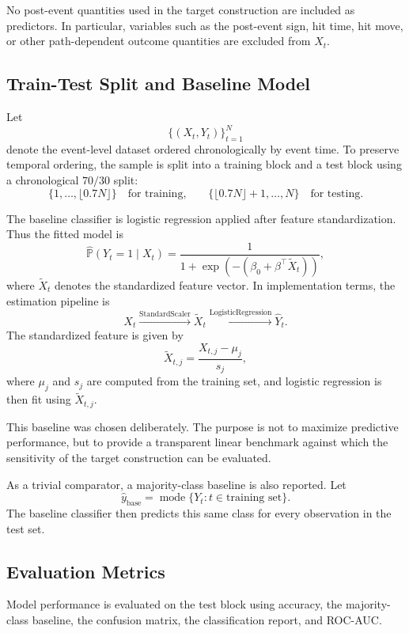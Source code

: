 \documentclass[11pt,a4paper]{article}
\begin{document}
	No post-event quantities used in the target construction are included as predictors. In particular, variables such as the post-event sign, hit time, hit move, or other path-dependent outcome quantities are excluded from \(X_t\).

	\subsection{Train-Test Split and Baseline Model}

	Let
	\[
	\{(X_t,Y_t)\}_{t=1}^{N}
	\]
	denote the event-level dataset ordered chronologically by event time. To preserve temporal ordering, the sample is split into a training block and a test block using a chronological \(70/30\) split:
	\[
	\{1,\dots,\lfloor 0.7N \rfloor\}
	\quad \text{for training,}
	\qquad
	\{\lfloor 0.7N \rfloor +1,\dots,N\}
	\quad \text{for testing.}
	\]

	The baseline classifier is logistic regression applied after feature standardization. Thus the fitted model is
	\[
	\widehat{\mathbb{P}}(Y_t=1\mid X_t)
	=
	\frac{1}{1+\exp\!\left(-(\beta_0+\beta^\top \widetilde X_t)\right)},
	\]
	where \(\widetilde X_t\) denotes the standardized feature vector. In implementation terms, the estimation pipeline is 
	\[
	X_t \xrightarrow{\text{StandardScaler}} \widetilde X_t \xrightarrow{\text{LogisticRegression}} \widehat Y_t.
	\]
	The standardized feature is given by
	\[
	\widetilde X_{t,j}=\frac{X_{t,j}-\mu_j}{s_j},
	\]
	where \(\mu_j\) and \(s_j\) are computed from the training set, and logistic regression is then fit using \(\widetilde X_{t,j}\).

	This baseline was chosen deliberately. The purpose is not to maximize predictive performance, but to provide a transparent linear benchmark against which the sensitivity of the target construction can be evaluated.

	As a trivial comparator, a majority-class baseline is also reported. Let
	\[
	\widehat y_{\mathrm{base}}
	=
	\operatorname{mode}\{Y_t : t \in \text{training set}\}.
	\]
	The baseline classifier then predicts this same class for every observation in the test set.

	\subsection{Evaluation Metrics}

	Model performance is evaluated on the test block using accuracy, the majority-class baseline, the confusion matrix, the classification report, and ROC-AUC.
\end{document}
